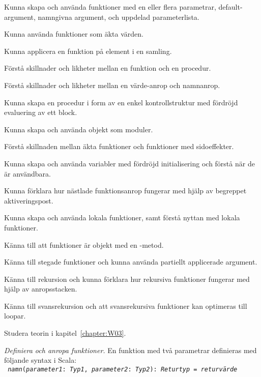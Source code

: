 
\Exercise{\ExeWeekTHREE}

\begin{Goals}
\item Kunna skapa och använda funktioner med en eller flera parametrar, default-argument, namngivna argument, och uppdelad parameterlista.
\item Kunna använda funktioner som äkta värden. 
\item Kunna applicera en funktion på element i en samling.
\item Förstå skillnader och likheter mellan en funktion och en procedur.
\item Förstå skillnader och likheter mellan en värde-anrop och namnanrop.
\item Kunna skapa en procedur i form av en enkel kontrollstruktur med fördröjd evaluering av ett block.
\item Kunna skapa och använda objekt som moduler.
\item Förstå skillnaden mellan äkta funktioner och funktioner med sidoeffekter.
\item Kunna skapa och använda variabler med fördröjd initialisering och förstå när de är användbara.
\item Kunna förklara hur nästlade funktionsanrop fungerar med hjälp av begreppet aktiveringspost.
\item Kunna skapa och använda lokala funktioner, samt förstå nyttan med lokala funktioner.
\item Känna till att funktioner är objekt med en -metod.
\item Känna till stegade funktioner och kunna använda partiellt applicerade argument. 
\item Känna till rekursion och kunna förklara hur rekursiva funktioner fungerar med hjälp av   anropsstacken.
\item Känna till svansrekursion och att svansrekursiva funktioner kan optimeras till loopar.
\end{Goals}

\begin{Preparations}
\item Studera teorin i kapitel~\ref{chapter:W03}.
\end{Preparations}

\BasicTasks %

\Task \label{task:funcall}\emph{Definiera och anropa funktioner.} En funktion med två parametrar definieras med följande syntax i Scala: \vspace{0.5em} \\  \texttt{ \textit{namn}(\textit{parameter1}: \textit{Typ1}, \textit{parameter2}: \textit{Typ2}): \textit{Returtyp} = \textit{returvärde}}

